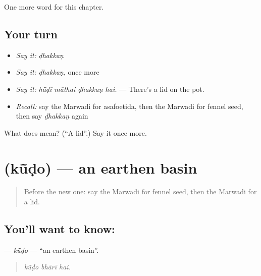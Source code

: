 \begin{grammarlens}[title={What you've built}]
One more word for this chapter.
\end{grammarlens}

\subsection*{Your turn}
\begin{itemize}
\raggedright
  \item \emph{Say it:} \emph{ḍhakkaṇ}
  \item \emph{Say it:} \emph{ḍhakkaṇ}, once more
  \item \emph{Say it:} \emph{hā̃ḍī māthai ḍhakkaṇ hai.} — There's a lid on the pot.
  \item \emph{Recall:} say the Marwadi for asafoetida, then the Marwadi for fennel seed, then say \emph{ḍhakkaṇ} again
\end{itemize}

\begin{tcolorbox}[breakable,colback=teal!4,colframe=teal!35!black,title={Before you move on}]
What does  mean? (\textquotedblleft{}A lid\textquotedblright{}.) Say it once more.
\end{tcolorbox}
\section[\texorpdfstring{\mw{कूंडो} (kū̃ḍo)}{कूंडो (kū̃ḍo)}]{ (kū̃ḍo) — an earthen basin}

\label{lesson:MW-C186-kudo}



\begin{quote}
Before the new one: say the Marwadi for fennel seed, then the Marwadi for a lid.
\end{quote}

\subsection*{You'll want to know: }
\textbf{} — \emph{kū̃ḍo} — \textquotedblleft{}an earthen basin\textquotedblright{}.

\begin{quote}
  
\end{quote}

\begin{quote}
\emph{kū̃ḍo bhārī hai.}
\end{quote}

